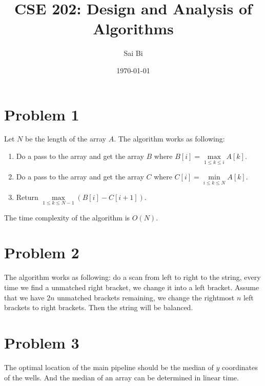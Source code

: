 \documentclass[a4paper,11pt]{article}
\theoremstyle{mytheor}
\begin{document}
\title{CSE 202: Design and Analysis of Algorithms}

\author{Sai Bi}

\date{\today}

\maketitle

\section*{Problem 1}
Let $N$ be the length of the array $A$. The algorithm works as following:
\begin{enumerate}
\item
Do a pass to the array and get the array $B$ where $B[i]=\max\limits_{1\leq k \leq i} A[k]$.
\item 
Do a pass to the array and get the array $C$ where $C[i]=\min\limits_{i\leq k \leq N} A[k]$.
\item
Return $\max\limits_{1\leq k \leq N-1} (B[i] - C[i+1])$.
\end{enumerate}
The time complexity of the algorithm is $O(N)$.

\section*{Problem 2}
The algorithm works as following: do a scan from left to right to the string, every time we find
a unmatched right bracket, we change it into a left bracket. Assume that we have $2n$ unmatched 
brackets remaining, we change the rightmost $n$ left brackets to right brackets. Then the string
will be balanced.

\section*{Problem 3}
The optimal location of the main pipeline should be the median of $y$ coordinates of the wells. And
the median of an array can be determined in linear time.
\end{document}
